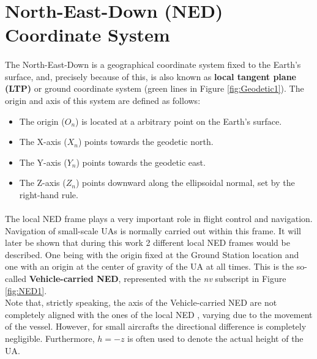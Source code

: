 \section{North-East-Down (NED) Coordinate System}\label{sec:ned}

\paragraph{} The North-East-Down is a geographical coordinate system fixed to the Earth's surface, and, precisely because of this, is also known as \textbf{local tangent plane (LTP)} or ground coordinate system (green lines in Figure \ref{fig:Geodetic1}). The origin and axis of this system are defined as follows: 
\begin{itemize}
\item{The origin (\textbf{$O_{n}$}) is located at a arbitrary point on the Earth's surface.}
\item{The X-axis (\textbf{$X_{n}$}) points towards the geodetic north.}
\item{The Y-axis (\textbf{$Y_{n}$}) points towards the geodetic east.}
\item{The Z-axis (\textbf{$Z_{n}$}) points downward along the ellipsoidal normal, set by the right-hand rule.}
\end{itemize}

\paragraph{} The local NED frame plays a very important role in flight control and navigation.
Navigation of small-scale UAs is normally carried out within this frame. It will later be shown that during this work 2 different local NED frames would be described. One being with the origin fixed at the Ground Station location and one with an origin at the center of gravity of the UA at all times. This is the so-called \textbf{Vehicle-carried NED}, represented with the \textit{nv} subscript in Figure \ref{fig:NED1}\cite{Houghton70}.\\
Note that, strictly speaking, the axis of the Vehicle-carried NED are not completely aligned with the ones of the local NED , varying due to the movement of the vessel. However, for small aircrafts the directional difference is completely negligible. Furthermore, $h = -z$ is often used to denote the actual height of the UA.

